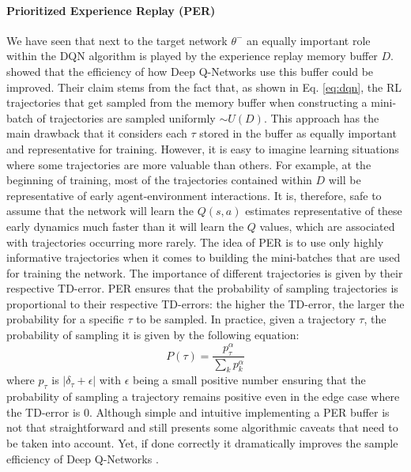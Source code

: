 \paragraph{\textbf{\uppercase{P}rioritized \uppercase{E}xperience \uppercase{R}eplay (\uppercase{PER})}} We have seen that next to the target network $\theta^{-}$ an equally important role within the DQN algorithm is played by the experience replay memory buffer $D$. \citet{schaul2015prioritized} showed that the efficiency of how Deep Q-Networks use this buffer could be improved. Their claim stems from the fact that, as shown in Eq. \ref{eq:dqn}, the RL trajectories that get sampled from the memory buffer when constructing a mini-batch of trajectories are sampled uniformly $\sim U(D)$. This approach has the main drawback that it considers each $\tau$ stored in the buffer as equally important and representative for training. However, it is easy to imagine learning situations where some trajectories are more valuable than others. For example, at the beginning of training, most of the trajectories contained within $D$ will be representative of early agent-environment interactions. It is, therefore, safe to assume that the network will learn the $Q(s,a)$ estimates representative of these early dynamics much faster than it will learn the $Q$ values, which are associated with trajectories occurring more rarely. The idea of PER is to use only highly informative trajectories when it comes to building the mini-batches that are used for training the network. The importance of different trajectories is given by their respective TD-error. PER ensures that the probability of sampling trajectories is proportional to their respective TD-errors: the higher the TD-error, the larger the probability for a specific $\tau$ to be sampled. In practice, given a trajectory $\tau$, the probability of sampling it is given by the following equation:
\begin{equation}
	P(\tau)=\frac{p_{\tau}^{\alpha}}{\sum_k p_{k}^{\alpha}}
\end{equation}
where $p_{\tau}$ is $|\delta_\tau + \epsilon|$ with $\epsilon$ being a small positive number ensuring that the probability of sampling a trajectory remains positive even in the edge case where the TD-error is $0$. Although simple and intuitive implementing a PER buffer is not that straightforward and still presents some algorithmic caveats that need to be taken into account. Yet, if done correctly it dramatically improves the sample efficiency of Deep Q-Networks \cite{narasimhan2015language}.


